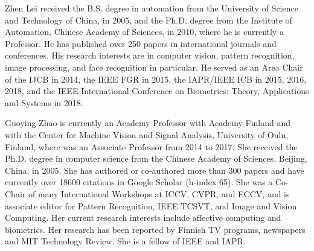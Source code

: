 \documentclass[10pt,journal,compsoc]{IEEEtran}
\begin{document}
	
\begin{IEEEbiography}{Zhen Lei}
received the B.S. degree in automation from the University of Science and Technology of China, in 2005, and the Ph.D. degree from the Institute of Automation, Chinese Academy of Sciences, in 2010, where he is currently a Professor. He has published over 250 papers in international journals and conferences. His research interests are in computer vision, pattern recognition, image processing, and face recognition in particular. He served as an Area Chair of the IJCB in 2014, the IEEE FGR in 2015, the IAPR/IEEE ICB in 2015, 2016, 2018, and the IEEE International Conference on Biometrics: Theory, Applications and Systems in 2018.  
\end{IEEEbiography}
	
	
\begin{IEEEbiography}{Guoying Zhao}
is currently an Academy Professor with Academy Finland and with the Center for Machine Vision and Signal Analysis, University of Oulu, Finland, where was an Associate Professor from 2014 to 2017. She received the Ph.D. degree in computer science from the Chinese Academy of Sciences, Beijing, China, in 2005. She has authored or co-authored more than 300 papers and have currently over 18600 citations in Google Scholar (h-index 65). She was a Co-Chair of many International Workshops at ICCV, CVPR, and ECCV, and is associate editor for Pattern Recognition, IEEE TCSVT, and Image and Vision Computing. Her current research interests include affective computing and biometrics. Her research has been reported by Finnish TV programs, newspapers and MIT Technology Review. She is a fellow of IEEE and IAPR.
\end{IEEEbiography}
\end{document}
